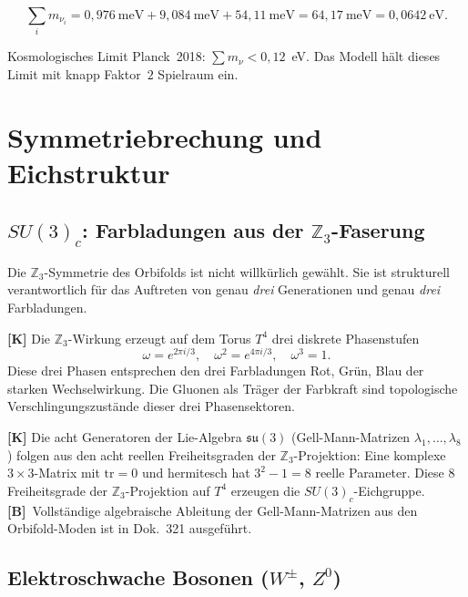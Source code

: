 \begin{equation}
  \sum_i m_{\nu_i}
  = 0{,}976~\text{meV} + 9{,}084~\text{meV} + 54{,}11~\text{meV}
  = 64{,}17~\text{meV}
  = 0{,}0642~\text{eV}.
  \label{eq:summe_nu}
\end{equation}

Kosmologisches Limit Planck~2018: $\sum m_\nu < 0{,}12$~eV.
Das Modell hält dieses Limit mit knapp Faktor~$2$ Spielraum ein. \checkmark

\section{Symmetriebrechung und Eichstruktur}
\label{sec:eich}

\subsection{$SU(3)_c$: Farbladungen aus der $\mathbb{Z}_3$-Faserung}

Die $\mathbb{Z}_3$-Symmetrie des Orbifolds ist nicht willkürlich gewählt.
Sie ist strukturell verantwortlich für das Auftreten von genau
\emph{drei} Generationen und genau \emph{drei} Farbladungen.

\textbf{[K]} Die $\mathbb{Z}_3$-Wirkung erzeugt auf dem Torus $T^4$
drei diskrete Phasenstufen
\begin{equation}
  \omega = e^{2\pi i/3},\quad \omega^2 = e^{4\pi i/3},\quad \omega^3 = 1.
\end{equation}
Diese drei Phasen entsprechen den drei Farbladungen Rot, Grün, Blau
der starken Wechselwirkung. Die Gluonen als Träger der Farbkraft sind
topologische Verschlingungszustände dieser drei Phasensektoren.

\textbf{[K]} Die acht Generatoren der Lie-Algebra $\mathfrak{su}(3)$
(Gell-Mann-Matrizen $\lambda_1,\ldots,\lambda_8$) folgen aus den acht
reellen Freiheitsgraden der $\mathbb{Z}_3$-Projektion: Eine komplexe
$3\times3$-Matrix mit $\mathrm{tr}=0$ und hermitesch hat $3^2-1=8$
reelle Parameter. Diese $8$ Freiheitsgrade der $\mathbb{Z}_3$-Projektion
auf $T^4$ erzeugen die $SU(3)_c$-Eichgruppe. \textbf{[B]}~Vollständige
algebraische Ableitung der Gell-Mann-Matrizen aus den Orbifold-Moden
ist in Dok.~321 ausgeführt.

\subsection{Elektroschwache Bosonen ($W^\pm$, $Z^0$)}

